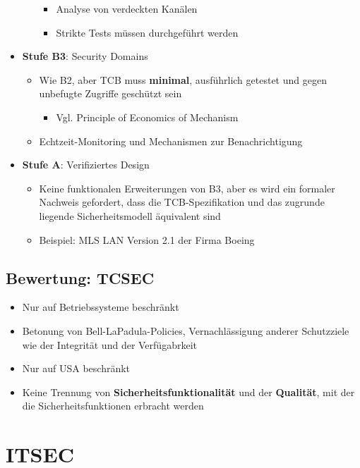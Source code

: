 \documentclass[openany]{book}
\begin{document}
\begin{itemize}
\begin{itemize}
\begin{itemize}
            \item Analyse von verdeckten Kanälen
            \item Strikte Tests müssen durchgeführt werden
        \end{itemize}
    \end{itemize}
    \item \textbf{Stufe B3}: Security Domains
    \begin{itemize}
        \item Wie B2, aber TCB muss \textbf{minimal}, ausführlich getestet und gegen unbefugte Zugriffe geschützt sein
        \begin{itemize}
            \item Vgl. Principle of Economics of Mechanism
        \end{itemize}
        \item Echtzeit-Monitoring und Mechanismen zur Benachrichtigung
    \end{itemize}
    \item \textbf{Stufe A}: Verifiziertes Design
    \begin{itemize}
        \item Keine funktionalen Erweiterungen von B3, aber es wird ein formaler Nachweis gefordert, dass die TCB-Spezifikation und das zugrunde liegende Sicherheitsmodell äquivalent sind
        \item Beispiel: MLS LAN Version 2.1 der Firma Boeing
    \end{itemize}
\end{itemize}

\subsection{Bewertung: TCSEC}

\begin{itemize}
    \item Nur auf Betriebssysteme beschränkt
    \item Betonung von Bell-LaPadula-Policies, Vernachlässigung anderer Schutzziele wie der Integrität und der Verfügabrkeit
    \item Nur auf USA beschränkt
    \item Keine Trennung von \textbf{Sicherheitsfunktionalität} und der \textbf{Qualität}, mit der die Sicherheitsfunktionen erbracht werden
\end{itemize}

\section{ITSEC}
\end{document}
